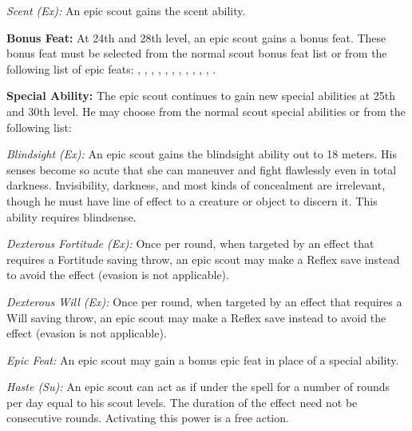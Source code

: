 \textit{Scent (Ex):} An epic scout gains the scent ability.

\textbf{Bonus Feat:} At 24th and 28th level, an epic scout gains a bonus feat. These bonus feat must be selected from the normal scout bonus feat list or from the following list of epic feats:
,
,
,
,
,
,
,
,
,
,
,
.

\textbf{Special Ability:} The epic scout continues to gain new special abilities at 25th and 30th level. He may choose from the normal scout special abilities or from the following list:

\textit{Blindsight (Ex):} An epic scout gains the blindsight ability out to 18 meters. His senses become so acute that she can maneuver and fight flawlessly even in total darkness. Invisibility, darkness, and most kinds of concealment are irrelevant, though he must have line of effect to a creature or object to discern it. This ability requires blindsense.

\textit{Dexterous Fortitude (Ex):} Once per round, when targeted by an effect that requires a Fortitude saving throw, an epic scout may make a Reflex save instead to avoid the effect (evasion is not applicable).

\textit{Dexterous Will (Ex):} Once per round, when targeted by an effect that requires a Will saving throw, an epic scout may make a Reflex save instead to avoid the effect (evasion is not applicable).

\textit{Epic Feat:} An epic scout may gain a bonus epic feat in place of a special ability.

\textit{Haste (Su):} An epic scout can act as if under the  spell for a number of rounds per day equal to \onefifth his scout levels. The duration of the effect need not be consecutive rounds. Activating this power is a free action.
